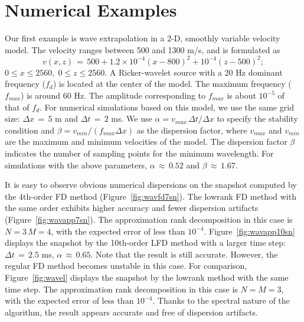 \section{Numerical Examples}


Our first example is wave extrapolation in a 2-D, smoothly variable velocity model. The velocity ranges between 500 and 1300 m/s, and is formulated as 
\begin{equation}
v(x,z)\,=\,500+1.2\times10^{-4}(x-800)^2+10^{-4}(z-500)^2;
\end{equation}
$0\le x\le2560,\;0\le z\le2560.$
A Ricker-wavelet source with a 20 Hz dominant frequency ($f_{d}$) is located at the center of the model. 
The maximum frequency ($f_{max}$) is around 60 Hz.  
The amplitude corresponding to $f_{max}$ is about $10^{-5}$ of that of $f_{d}$.
For numerical simulations based on this model, we use the same grid size: $\Delta x\,=\,5$ m and $\Delta t\,=\,2$ ms.
We use $\alpha=v_{max}\,\Delta t/\Delta x$ to specify the stability condition and $\beta=v_{min}/(f_{max}\Delta x)$ as the dispersion factor, where $v_{max}$ and $v_{min}$ are the maximum and minimum velocities of the model.
The dispersion factor $\beta$ indicates the number of sampling points 
for the minimum wavelength. 
For simulations with the above parameters, $\alpha\,\approx\,0.52$ and
$\beta \,\approx\, 1.67$.



It is easy to observe obvious numerical dispersions on the snapshot computed by the 4th-order FD method (Figure~\ref{fig:wavfd7sn}). 
The lowrank FD method with the same order exhibits higher accuracy and fewer dispersion artifacts (Figure~\ref{fig:wavapp7sn}). 
The approximation
rank decomposition in this case is $N=3\, M=4$, with the expected error of
less than $10^{-4}$.
Figure~\ref{fig:wavapp10sn} displays the snapshot by the 10th-order LFD method with a larger time step: $\Delta t\,=\,2.5$ ms, $\alpha\,\approx\,0.65$. Note that the result is still accurate. However, the regular FD method becomes unstable in this case.   
For comparison, Figure~\ref{fig:wavel} displays the snapshot by the lowrank method with the same time step. 
The approximation
rank decomposition in this case is $N=M=3$, with the expected error of
less than $10^{-4}$.
Thanks to the spectral nature of the algorithm, the result appears accurate and free of dispersion artifacts.   

